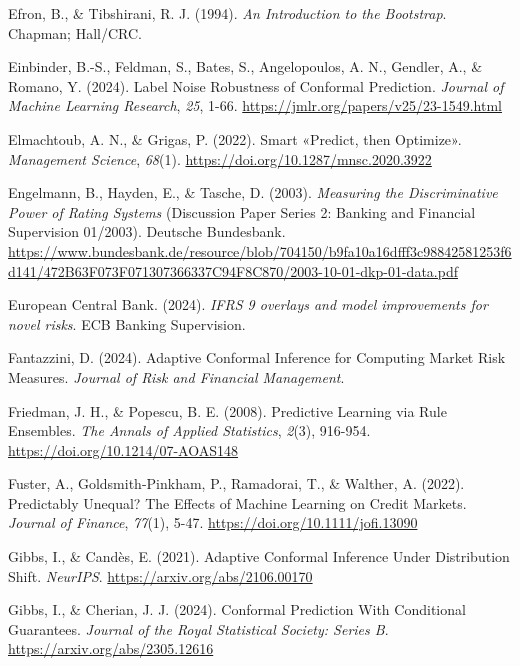 \documentclass[
  spanish,
  11pt,
  letterpaper,
]{scrbook}
\newlength{\cslhangindent}
\newenvironment{CSLReferences}[2] %
 {\begin{list}{}{%
  \setlength{\itemindent}{0pt}
  \setlength{\leftmargin}{0pt}
  \setlength{\parsep}{0pt}
  \ifodd #1
   \setlength{\leftmargin}{\cslhangindent}
   \setlength{\itemindent}{-1\cslhangindent}
  \fi
  \setlength{\itemsep}{#2\baselineskip}}}
 {\end{list}}
\theoremstyle{plain}
\theoremstyle{remark}
\begin{document}
\begin{CSLReferences}{1}{0}
Efron, B., \& Tibshirani, R. J. (1994). \emph{An Introduction to the
Bootstrap}. Chapman; Hall/CRC.

Einbinder, B.-S., Feldman, S., Bates, S., Angelopoulos, A. N., Gendler,
A., \& Romano, Y. (2024). Label Noise Robustness of Conformal
Prediction. \emph{Journal of Machine Learning Research}, \emph{25},
1-66. \url{https://jmlr.org/papers/v25/23-1549.html}

Elmachtoub, A. N., \& Grigas, P. (2022). Smart {«Predict, then
Optimize»}. \emph{Management Science}, \emph{68}(1).
\url{https://doi.org/10.1287/mnsc.2020.3922}

Engelmann, B., Hayden, E., \& Tasche, D. (2003). \emph{Measuring the
Discriminative Power of Rating Systems} (Discussion Paper Series 2:
Banking and Financial Supervision 01/2003). Deutsche Bundesbank.
\url{https://www.bundesbank.de/resource/blob/704150/b9fa10a16dfff3c98842581253f6d141/472B63F073F071307366337C94F8C870/2003-10-01-dkp-01-data.pdf}

European Central Bank. (2024). \emph{{IFRS} 9 overlays and model
improvements for novel risks}. ECB Banking Supervision.

Fantazzini, D. (2024). Adaptive Conformal Inference for Computing Market
Risk Measures. \emph{Journal of Risk and Financial Management}.

Friedman, J. H., \& Popescu, B. E. (2008). Predictive Learning via Rule
Ensembles. \emph{The Annals of Applied Statistics}, \emph{2}(3),
916-954. \url{https://doi.org/10.1214/07-AOAS148}

Fuster, A., Goldsmith-Pinkham, P., Ramadorai, T., \& Walther, A. (2022).
Predictably Unequal? The Effects of Machine Learning on Credit Markets.
\emph{Journal of Finance}, \emph{77}(1), 5-47.
\url{https://doi.org/10.1111/jofi.13090}

Gibbs, I., \& Candès, E. (2021). Adaptive Conformal Inference Under
Distribution Shift. \emph{NeurIPS}.
\url{https://arxiv.org/abs/2106.00170}

Gibbs, I., \& Cherian, J. J. (2024). Conformal Prediction With
Conditional Guarantees. \emph{Journal of the Royal Statistical Society:
Series B}. \url{https://arxiv.org/abs/2305.12616}


\end{CSLReferences}
\end{document}
